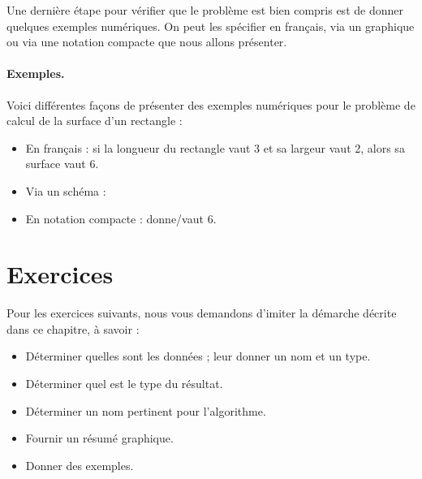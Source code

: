 		Une dernière étape pour vérifier que le problème
		est bien compris est de donner quelques exemples numériques.
		On peut les spécifier en français, 
		via un graphique ou via une notation compacte
		que nous allons présenter.
	
		\begin{Emphase}
			\paragraph{Exemples.}
			Voici différentes façons de présenter des exemples numériques
			pour le problème de calcul de la surface d'un rectangle :
			\begin{itemize}
			\item En français : 
				si la longueur du rectangle vaut 3 et sa largeur vaut 2, 
				alors sa surface vaut 6.			
			\item Via un schéma :	
				\begin{center}
				\end{center}
			\item En notation compacte :
				 donne/vaut $6$.
			\end{itemize}
		\end{Emphase}
	
\clearpage
	\section{Exercices}
	
		Pour les exercices suivants, 
		nous vous demandons d’imiter la démarche décrite dans ce chapitre, 
		à savoir :
		\begin{itemize}
			\item Déterminer quelles sont les données ;
				leur donner un nom et un type.
			\item Déterminer quel est le type du résultat.
			\item Déterminer un nom pertinent pour l'algorithme.
			\item Fournir un résumé graphique.
			\item Donner des exemples.
		\end{itemize}
	
